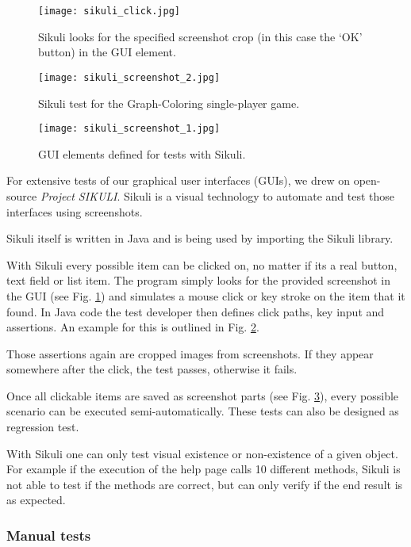 \begin{figure}[!h]
	\centering
	\texttt{[image: sikuli\_click.jpg]}
	\caption{Sikuli looks for the specified screenshot crop (in this case the `OK' button) in the GUI element.}
	\label{img:screenSikuli1}
\end{figure}
\begin{figure}[!h]
	\centering
	\texttt{[image: sikuli\_screenshot\_2.jpg]}
	\caption{Sikuli test for the Graph-Coloring single-player game.}
	\label{img:screenSikuli2}
\end{figure}
\begin{figure}[!h]
	\centering
	\texttt{[image: sikuli\_screenshot\_1.jpg]}
	\caption{GUI elements defined for tests with Sikuli.}
	\label{img:screenSikuli3}
\end{figure}
For extensive tests of our graphical user interfaces (GUIs), we drew on open-source \emph{Project SIKULI}. Sikuli is a visual technology to automate and test those interfaces using screenshots.\par
Sikuli itself is written in Java and is being used by importing the Sikuli library.\par
With Sikuli every possible item can be clicked on, no matter if its a real button, text field or list item. The program simply looks for the provided screenshot in the GUI (see Fig. \ref{img:screenSikuli1}) and simulates a mouse click or key stroke on the item that it found. In Java code the test developer then defines click paths, key input and assertions. An example for this is outlined in Fig. \ref{img:screenSikuli2}.\par
Those assertions again are cropped images from screenshots. If they appear somewhere after the click, the test passes, otherwise it fails.\par
Once all clickable items are saved as screenshot parts (see Fig. \ref{img:screenSikuli3}), every possible scenario can be executed semi-automatically. These tests can also be designed as regression test.\par
With Sikuli one can only test visual existence or non-existence of a given object. For example if the execution of the help page calls 10 different methods, Sikuli is not able to test if the methods are correct, but can only verify if the end result is as expected.\par

\subsubsection{Manual tests}

